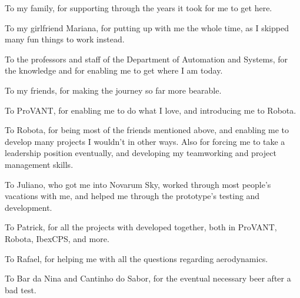\begin{agradecimentos}

To my family, for supporting through the years it took for me to get here.

To my girlfriend Mariana, for putting up with me the whole time, as I skipped many fun things to work instead.

To the professors and staff of the Department of Automation and Systems, for the knowledge and for enabling me to get where I am today.

To my friends, for making the journey so far more bearable.

To ProVANT, for enabling me to do what I love, and introducing me to Robota. 

To Robota, for being most of the friends mentioned above, and enabling me to develop many projects I wouldn't in other ways. Also for forcing me to take a leadership position eventually, and developing my teamworking and project management skills.

To Juliano, who got me into Novarum Sky, worked through most people's vacations with me, and helped me through the prototype's testing and development.

To Patrick, for all the projects with developed together, both in ProVANT, Robota, IbexCPS, and more.

To Rafael, for helping me with all the questions regarding aerodynamics.%

To Bar da Nina and Cantinho do Sabor, for the eventual necessary beer after a bad test.



\end{agradecimentos}
